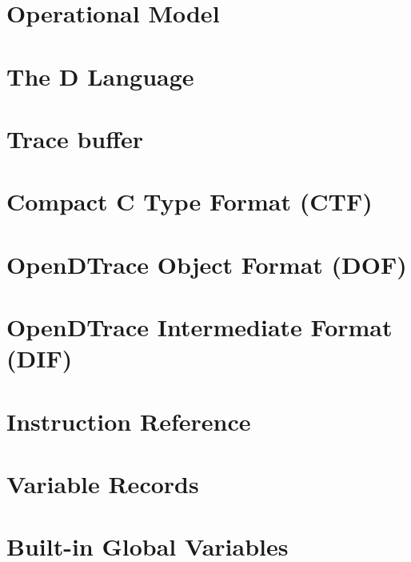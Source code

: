 \chapter{Operational Model}
\label{chap:opendtrace-operation}


\chapter{The D Language}
\label{chap:opendtrace-dlang}


\chapter{Trace buffer}
\label{chap:opendtrace-trace-buffer}


\chapter{Compact C Type Format (CTF)}
\label{chap:opendtrace-ctf}


\chapter{OpenDTrace Object Format (DOF)}
\label{chap:opendtrace-object-format}


\chapter{OpenDTrace Intermediate Format (DIF)}
\label{chap:opendtrace-intermediate-format}


\chapter{Instruction Reference}
\label{chap:opendtrace-instruction-reference}


\chapter{Variable Records}
\label{chap:opendtrace-variable-records}


\chapter{Built-in Global Variables}
\label{chap:opendtrace-global-vars}


